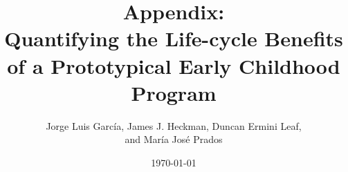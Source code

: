 




\renewcommand\theassumption{AA--\arabic{assumption}}


\title{\Large \textbf{Appendix: \\ Quantifying the Life-cycle Benefits \\ of a Prototypical Early Childhood Program}}

\author{Jorge Luis Garc\'{i}a, James J. Heckman, Duncan Ermini Leaf, \\ and Mar\'{i}a Jos\'{e} Prados}
\date{\today}


\maketitle
\thispagestyle{empty}


\tableofcontents
\listoffigures
\listoftables
\doublespacing


\begin{appendices}

\setcounter{figure}{0}  \renewcommand{\thefigure}{A.\arabic{figure}}
\setcounter{table}{0}   \renewcommand{\thetable}{A.\arabic{table}}


\setcounter{figure}{0}  \renewcommand{\thefigure}{B.\arabic{figure}}
\setcounter{table}{0}   \renewcommand{\thetable}{B.\arabic{table}}


\setcounter{figure}{0}  \renewcommand{\thefigure}{C.\arabic{figure}}
\setcounter{table}{0}   \renewcommand{\thetable}{C.\arabic{table}}


\setcounter{figure}{0}  \renewcommand{\thefigure}{D.\arabic{figure}}
\setcounter{table}{0}   \renewcommand{\thetable}{D.\arabic{table}}


\setcounter{figure}{0}  \renewcommand{\thefigure}{E.\arabic{figure}}
\setcounter{table}{0}   \renewcommand{\thetable}{E.\arabic{table}}


\setcounter{figure}{0}  \renewcommand{\thefigure}{F.\arabic{figure}}
\setcounter{table}{0}   \renewcommand{\thetable}{F.\arabic{table}}


\setcounter{figure}{0}  \renewcommand{\thefigure}{G.\arabic{figure}}
\setcounter{table}{0}   \renewcommand{\thetable}{G.\arabic{table}}


\end{appendices}

\renewcommand{\refname}{Appendix References}
\clearpage
\singlespace




